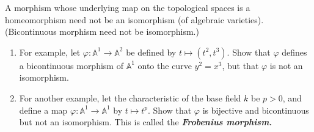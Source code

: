 \begin{manualexercise}{3.2}
	A morphism whose underlying map on the topological spaces is a homeomorphism need not be an isomorphism (of algebraic varieties). (Bicontinuous morphism need not be isomorphism.)
	\begin{enumerate}[label=\alph*.]
		\item For example, let $\varphi:\mathbb{A}^1\to \mathbb{A}^2$ be defined by $t\mapsto (t^2,t^3)$. Show that $\varphi$ defines a bicontinuous morphism of $\mathbb{A}^1$ onto the curve $y^2=x^3$, but that $\varphi$ is not an isomorphism.

		\item For another example, let the characteristic of the base field $k$ be $p>0$, and define a map $\varphi:\mathbb{A}^1\to \mathbb{A}^1$ by $t\mapsto t^p$. Show that $\varphi$ is bijective and bicontinuous but not an isomorphism. This is called the \textit{\textbf{Frobenius morphism.}}
	\end{enumerate}
\end{manualexercise}


